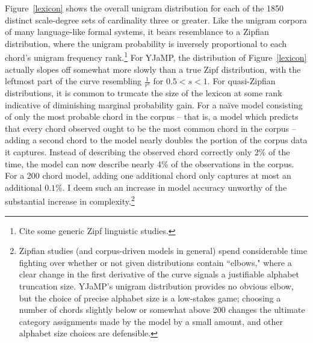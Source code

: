 Figure~\ref{lexicon} shows the overall unigram distribution for each of the 1850 distinct scale-degree sets of cardinality three or greater.  Like the unigram corpora of many language-like formal systems, it bears resemblance to a Zipfian distribution, where the unigram probability is inversely proportional to each chord's unigram frequency rank.\footnote{Cite some generic Zipf linguistic studies.}  For YJaMP, the distribution of Figure~\ref{lexicon} actually slopes off somewhat more slowly than a true Zipf distribution, with the leftmost part of the curve resembling $\frac{1}{r^s}$ for $0.5 < s < 1$.  For quasi-Zipfian distributions, it is common to truncate the size of the lexicon at some rank indicative of diminishing marginal probability gain. For a na\"{i}ve model consisting of only the most probable chord in the corpus -- that is, a model which predicts that every chord observed ought to be the most common chord in the corpus -- adding a second chord to the model nearly doubles the portion of the corpus data it captures.  Instead of describing the observed chord correctly only 2\% of the time, the model can now describe nearly 4\% of the observations in the corpus.  For a 200 chord model, adding one additional chord only captures at most an additional $0.1\%$.  I deem such an increase in model accuracy unworthy of the substantial increase in complexity.\footnote{Zipfian studies (and corpus-driven models in general) spend considerable time fighting over whether or not given distributions contain ``elbows," where a clear change in the first derivative of the curve signals a justifiable alphabet truncation size.  YJaMP's unigram distribution provides no obvious elbow, but the choice of precise alphabet size is a low-stakes game; choosing a number of chords slightly below or somewhat above 200 changes the ultimate category assignments made by the model by a small amount, and other alphabet size choices are defensible.}

